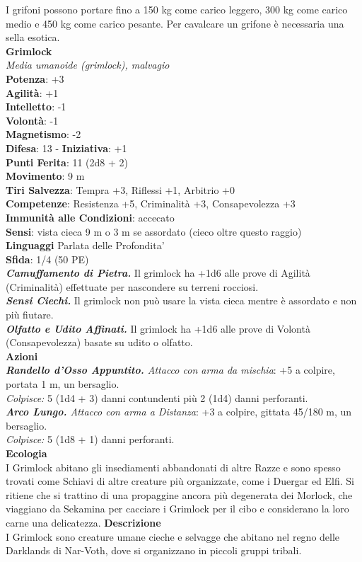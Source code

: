 \begin{multicols}{2}
I grifoni possono portare fino a 150 kg come carico leggero, 300 kg come carico medio e 450 kg come carico pesante. Per cavalcare un grifone è necessaria una sella esotica.\\


\medskip\textbf{Grimlock}\\
\emph{Media umanoide (grimlock), malvagio}\\
\textbf{Potenza}: +3\\
\textbf{Agilità}: +1\\
\textbf{Intelletto}: -1\\
\textbf{Volontà}: -1\\
\textbf{Magnetismo}: -2\\
\textbf{Difesa}: 13 - \textbf{Iniziativa}: +1\\
\textbf{Punti Ferita}: 11 (2d8 + 2)\\
\textbf{Movimento}: 9 m\\
\textbf{Tiri Salvezza}: Tempra +3, Riflessi +1, Arbitrio +0\\
\textbf{Competenze}: Resistenza +5, Criminalità +3, Consapevolezza +3\\
\textbf{Immunità alle Condizioni}: accecato\\
\textbf{Sensi}: vista cieca 9 m o 3 m se assordato (cieco oltre questo raggio)\\
\textbf{Linguaggi} Parlata delle Profondita'\\
\textbf{Sfida}: 1/4 (50 PE)\smallskip\\
\emph{\textbf{Camuffamento di Pietra.}} Il grimlock ha +1d6 alle prove di Agilità (Criminalità) effettuate per nascondere su terreni rocciosi.\\
\emph{\textbf{Sensi Ciechi.}} Il grimlock non può usare la vista cieca mentre è assordato e non più fiutare.\\
\emph{\textbf{Olfatto e Udito Affinati.}} Il grimlock ha +1d6 alle prove di Volontà (Consapevolezza) basate su udito o olfatto.\\
\smallskip\textbf{Azioni}\\
\emph{\textbf{Randello d'Osso Appuntito.} Attacco con arma da mischia}: +5 a colpire, portata 1 m, un bersaglio.\\
\emph{Colpisce:} 5 (1d4 + 3) danni contundenti più 2 (1d4) danni perforanti.\\
\emph{\textbf{Arco Lungo.} Attacco con arma a Distanza}: +3 a colpire, gittata 45/180 m, un bersaglio.\\
\emph{Colpisce:} 5 (1d8 + 1) danni perforanti.\\
\textbf{Ecologia}\\
I Grimlock abitano gli insediamenti abbandonati di altre Razze e sono spesso trovati come Schiavi di altre creature più organizzate, come i Duergar ed Elfi. Si ritiene che si trattino di una propaggine ancora più degenerata dei Morlock, che viaggiano da Sekamina per cacciare i Grimlock per il cibo e considerano la loro carne una delicatezza.
\textbf{Descrizione}\\
I Grimlock sono creature umane cieche e selvagge che abitano nel regno delle Darklands di Nar-Voth, dove si organizzano in piccoli gruppi tribali.\\


\end{multicols}
